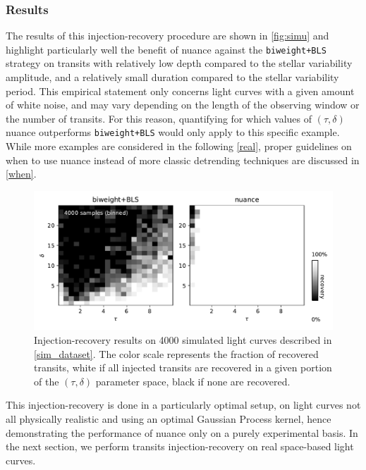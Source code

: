 \documentclass{aastex631}
\newcommand{\wtls}{\texttt{biweight+BLS}}
\begin{document}
\subsubsection*{Results}
The results of this injection-recovery procedure are shown in \autoref{fig:simu} and highlight particularly well the benefit of \textsf{nuance} against the \wtls{} strategy on transits with relatively low depth compared to the stellar variability amplitude, and a relatively small duration compared to the stellar variability period. This empirical statement only concerns light curves with a given amount of white noise, and may vary depending on the length of the observing window or the number of transits. For this reason, quantifying for which values of $(\tau, \delta)$ \textsf{nuance} outperforms \wtls{} would only apply to this specific example. While more examples are considered in the following \autoref{real}, proper guidelines on when to use \textsf{nuance} instead of more classic detrending techniques are discussed in \autoref{when}.
\begin{figure}[H]
    \begin{centering}
        \includegraphics[width=0.85\linewidth]{../workflows/synthetic-injection-recovery/figures/synthetic_ir.pdf}
        \caption{Injection-recovery results on 4000 simulated light curves described in \autoref{sim_dataset}. The color scale represents the fraction of recovered transits, white if all injected transits are recovered in a given portion of the $(\tau, \delta)$ parameter space, black if none are recovered.}
        \label{fig:simu}
    \end{centering}
\end{figure}

\noindent This injection-recovery is done in a particularly optimal setup, on light curves not all physically realistic and using an optimal Gaussian Process kernel, hence demonstrating the performance of \textsf{nuance} only on a purely experimental basis. In the next section, we perform transits injection-recovery on real space-based light curves.
\end{document}
